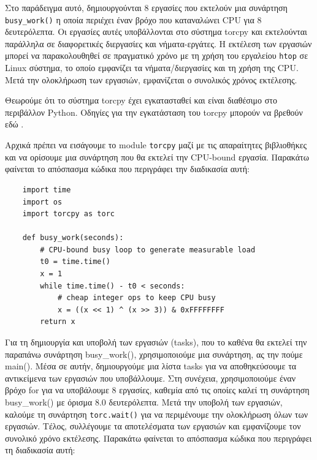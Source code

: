 Στο παράδειγμα αυτό, δημιουργούνται 8 εργασίες που εκτελούν μια συνάρτηση \texttt{busy\_work()} η οποία περιέχει έναν βρόχο που καταναλώνει CPU για 8 δευτερόλεπτα. Οι εργασίες αυτές υποβάλλονται στο σύστημα torcpy και εκτελούνται παράλληλα σε διαφορετικές διεργασίες και νήματα-εργάτες. Η εκτέλεση των εργασιών μπορεί να παρακολουθηθεί σε πραγματικό χρόνο με τη χρήση του εργαλείου \texttt{htop} σε Linux σύστημα, το οποίο εμφανίζει τα νήματα/διεργασίες και τη χρήση της CPU. Μετά την ολοκλήρωση των εργασιών, εμφανίζεται ο συνολικός χρόνος εκτέλεσης.

Θεωρούμε ότι το σύστημα torcpy έχει εγκατασταθεί και είναι διαθέσιμο στο περιβάλλον Python. Οδηγίες για την εγκατάσταση του torcpy μπορούν να βρεθούν εδώ \cite{ibm_torcpy}.

Αρχικά πρέπει να εισάγουμε το module \texttt{torcpy} μαζί με τις απαραίτητες βιβλιοθήκες και να ορίσουμε μια συνάρτηση που θα εκτελεί την CPU-bound εργασία. Παρακάτω φαίνεται το απόσπασμα κώδικα που περιγράφει την διαδικασία αυτή:

\begin{verbatim}
    import time
    import os
    import torcpy as torc

    def busy_work(seconds):
        # CPU-bound busy loop to generate measurable load
        t0 = time.time()
        x = 1
        while time.time() - t0 < seconds:
            # cheap integer ops to keep CPU busy
            x = ((x << 1) ^ (x >> 3)) & 0xFFFFFFFF
        return x
\end{verbatim}

Για τη δημιουργία και υποβολή των εργασιών (tasks), που το καθένα θα εκτελεί την παραπάνω συνάρτηση busy\_work(), χρησιμοποιούμε μια συνάρτηση, ας την πούμε main(). Μέσα σε αυτήν, δημιουργούμε μια λίστα tasks για να αποθηκεύσουμε τα αντικείμενα των εργασιών που υποβάλλουμε. Στη συνέχεια, χρησιμοποιούμε έναν βρόχο for για να υποβάλουμε 8 εργασίες, καθεμία από τις οποίες καλεί τη συνάρτηση busy\_work() με όρισμα 8.0 δευτερόλεπτα. Μετά την υποβολή των εργασιών, καλούμε τη συνάρτηση \texttt{torc.wait()} για να περιμένουμε την ολοκλήρωση όλων των εργασιών. Τέλος, συλλέγουμε τα αποτελέσματα των εργασιών και εμφανίζουμε τον συνολικό χρόνο εκτέλεσης. Παρακάτω φαίνεται το απόσπασμα κώδικα που περιγράφει τη διαδικασία αυτή:

